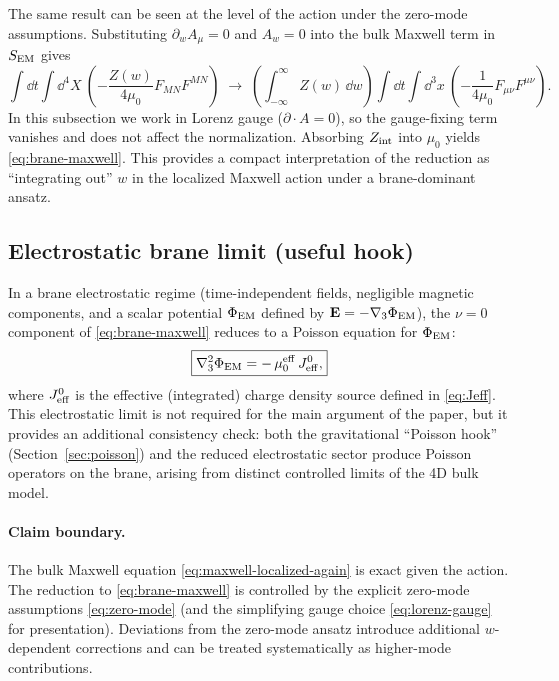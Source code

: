 \documentclass[11pt]{article}
\begin{document}
The same result can be seen at the level of the action under the zero-mode assumptions. Substituting $\partial_w A_\mu=0$ and $A_w=0$ into the bulk Maxwell term in $S_{\rm EM}$ gives
\begin{equation}
\int \dd t\int \dd^4X\ \left(-\frac{Z(w)}{4\mu_0}F_{MN}F^{MN}\right)
\;\longrightarrow\;
\left(\int_{-\infty}^{\infty} Z(w)\,\dd w\right)
\int \dd t\int \dd^3x\ \left(-\frac{1}{4\mu_0}F_{\mu\nu}F^{\mu\nu}\right).
\end{equation}
In this subsection we work in Lorenz gauge ($\partial\!\cdot\!A=0$), so the gauge-fixing term vanishes and does not affect the normalization. Absorbing $Z_{\rm int}$ into $\mu_0$ yields \eqref{eq:brane-maxwell}. This provides a compact interpretation of the reduction as ``integrating out'' $w$ in the localized Maxwell action under a brane-dominant ansatz.

\subsection{Electrostatic brane limit (useful hook)}
\label{sec:emreduction-electrostatic}

In a brane electrostatic regime (time-independent fields, negligible magnetic components, and a scalar potential $\Phi_{\rm EM}$ defined by $\mathbf{E}=-\nabla_3\Phi_{\rm EM}$), the $\nu=0$ component of \eqref{eq:brane-maxwell} reduces to a Poisson equation for $\Phi_{\rm EM}$:
\begin{equation}
\boxed{
\nabla_3^2 \Phi_{\rm EM} = -\,\mu_0^{\rm eff}\,J_{\rm eff}^0,
}
\label{eq:electrostatic-poisson}
\end{equation}
where $J_{\rm eff}^0$ is the effective (integrated) charge density source defined in \eqref{eq:Jeff}. This electrostatic limit is not required for the main argument of the paper, but it provides an additional consistency check: both the gravitational ``Poisson hook'' (Section~\ref{sec:poisson}) and the reduced electrostatic sector produce Poisson operators on the brane, arising from distinct controlled limits of the 4D bulk model.

\paragraph{Claim boundary.}
The bulk Maxwell equation \eqref{eq:maxwell-localized-again} is exact given the action. The reduction to \eqref{eq:brane-maxwell} is controlled by the explicit zero-mode assumptions \eqref{eq:zero-mode} (and the simplifying gauge choice \eqref{eq:lorenz-gauge} for presentation). Deviations from the zero-mode ansatz introduce additional $w$-dependent corrections and can be treated systematically as higher-mode contributions.
\end{document}
